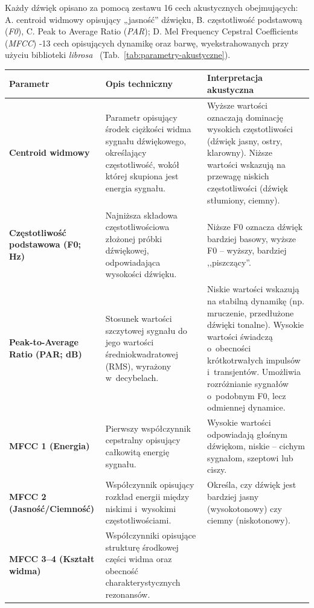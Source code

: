 \documentclass{article}
\begin{document}
Każdy dźwięk opisano za pomocą zestawu 16 cech akustycznych obejmujących: A. centroid widmowy opisujący „jasność” dźwięku, B. częstotliwość podstawową (\textit{F0}), C. Peak to Average Ratio (\textit{PAR}); D. Mel Frequency Cepstral Coefficients (\textit{MFCC}) -13 cech opisujących dynamikę oraz barwę, wyekstrahowanych przy użyciu biblioteki \textit{librosa}~\cite{mcfee2015librosa} (Tab.~\ref{tab:parametry-akustyczne}).
\begin{table}[H]
\centering
\scriptsize
\renewcommand{\arraystretch}{1.0}
\setlength{\aboverulesep}{1pt}
\setlength{\belowrulesep}{1pt}
\begin{tabularx}{\textwidth}{@{}>{\bfseries}p{3.2cm}LL@{}}
\toprule
\textbf{Parametr} & \textbf{Opis techniczny} & \textbf{Interpretacja akustyczna} \\
\midrule
Centroid widmowy
& Parametr opisujący środek ciężkości widma sygnału dźwiękowego, określający częstotliwość, wokół której skupiona jest energia sygnału.
& Wyższe wartości oznaczają dominację wysokich częstotliwości (dźwięk jasny, ostry, klarowny). Niższe wartości wskazują na przewagę niskich częstotliwości (dźwięk stłumiony, ciemny). \\
\midrule
Częstotliwość podstawowa (F0; Hz)
& Najniższa składowa częstotliwościowa złożonej próbki dźwiękowej, odpowiadająca wysokości dźwięku.
& Niższe F0 oznacza dźwięk bardziej basowy, wyższe F0 -- wyższy, bardziej ,,piszczący''. \\
\midrule
Peak-to-Average Ratio (PAR; dB)
& Stosunek wartości szczytowej sygnału do jego wartości średniokwadratowej (RMS), wyrażony w~decybelach.
& Niskie wartości wskazują na stabilną dynamikę (np. mruczenie, przedłużone dźwięki tonalne). Wysokie wartości świadczą o~obecności krótkotrwałych impulsów i~transjentów. Umożliwia rozróżnianie sygnałów o~podobnym F0, lecz odmiennej dynamice. \\
\midrule
MFCC 1 (Energia)
& Pierwszy współczynnik cepstralny opisujący całkowitą energię sygnału.
& Wysokie wartości odpowiadają głośnym dźwiękom, niskie -- cichym sygnałom, szeptowi lub ciszy. \\
\midrule
MFCC 2 (Jasność/Ciemność)
& Współczynnik opisujący rozkład energii między niskimi i~wysokimi częstotliwościami.
& Określa, czy dźwięk jest bardziej jasny (wysokotonowy) czy ciemny (niskotonowy). \\
\midrule
MFCC 3--4 (Kształt widma)
& Współczynniki opisujące strukturę środkowej części widma oraz obecność charakterystycznych rezonansów.

\end{tabularx}
\end{table}
\end{document}
